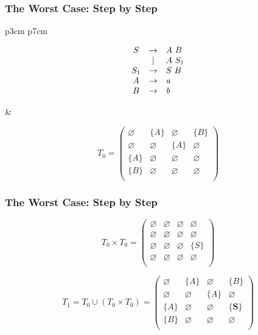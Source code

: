 \documentclass[xcolor=table]{beamer}
\begin{document}
\begin{frame}
  \transwipe[direction=90]
  \frametitle{The Worst Case: Step by Step}
\begin{tabular}{p{3cm} p{7cm} }
\begin{figure}[h]
   \[
\begin{array}{ccl}
    S & \rightarrow & A \ B \\
      & | & A \ S_1 \\
    S_1 & \rightarrow & S \ B \\
    A & \rightarrow & \text{\emph{a}} \\ 
    B & \rightarrow & \text{\emph{b}} \\ 
\end{array}
\]
\label{ProductionRulesExampleQueryCNF}
\end{figure}
  
&   
  
\begin{figure}[h]
\[
T_0 = \begin{pmatrix}
    \varnothing & \{A\}       & \varnothing & \{B\}       \\
    \varnothing & \varnothing & \{A\}       & \varnothing \\
    \{A\}       & \varnothing & \varnothing & \varnothing \\
    \{B\}       & \varnothing & \varnothing & \varnothing \\
\end{pmatrix}
\]

\end{figure}
  \end{tabular}
\end{frame}     
 
\begin{frame}[noframenumbering]
  \transwipe[direction=90]
  \frametitle{The Worst Case: Step by Step}
\begin{figure}[h]
\[
T_0 \times T_0 = \begin{pmatrix}
	\varnothing & \varnothing & \varnothing & \varnothing \\
	\varnothing & \varnothing & \varnothing & \varnothing \\
	\varnothing & \varnothing & \varnothing & \{S\}       \\
	\varnothing & \varnothing & \varnothing & \varnothing \\
\end{pmatrix}
\]

\[
T_1 = T_0 \cup (T_0 \times T_0) = \begin{pmatrix}
	\varnothing & \{A\}       & \varnothing & \{B\}       \\
	\varnothing & \varnothing & \{A\}       & \varnothing \\
	\{A\}       & \varnothing & \varnothing & \{\pmb{S}\}       \\
	\{B\}       & \varnothing & \varnothing & \varnothing \\
\end{pmatrix}
\]
\label{ExampleQueryFirstIteration}
\end{figure}
\end{frame} 
\end{document}
